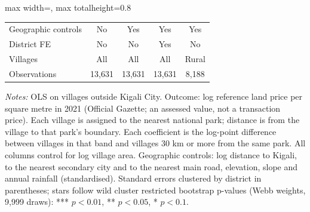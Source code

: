 \documentclass[11pt]{article}
\begin{document}
\begin{table}[H]
\begin{adjustbox}{max width=\textwidth, max totalheight=0.8\textheight}
\begin{tabular}{lcccc}
Geographic controls & No & Yes & Yes & Yes \\
District FE & No & No & Yes & No \\
Villages & All & All & All & Rural \\
Observations & 13,631 & 13,631 & 13,631 & 8,188 \\
\bottomrule
\end{tabular}
\end{adjustbox}
\begin{minipage}{0.97\textwidth}\scriptsize
\textit{Notes:} OLS on villages outside Kigali City. Outcome: log reference land price per square metre in 2021 (Official Gazette; an assessed value, not a transaction price). Each village is assigned to the nearest national park; distance is from the village to that park's boundary. Each coefficient is the log-point difference between villages in that band and villages 30 km or more from the same park. All columns control for log village area. Geographic controls: log distance to Kigali, to the nearest secondary city and to the nearest main road, elevation, slope and annual rainfall (standardised). Standard errors clustered by district in parentheses; stars follow wild cluster restricted bootstrap p-values (Webb weights, 9,999 draws): *** $p<0.01$, ** $p<0.05$, * $p<0.1$.
\end{minipage}
\end{table}
\clearpage
\end{document}
